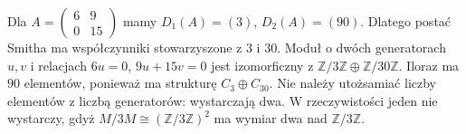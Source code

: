\begin{przyklad}
\label{aa:prz:smith-cokernel-90}
Dla $A=\begin{pmatrix}6&9\\0&15\end{pmatrix}$
mamy $D_1(A)=(3)$, $D_2(A)=(90)$. Dlatego
postać Smitha ma współczynniki stowarzyszone z $3$ i $30$.
Moduł o dwóch generatorach $u,v$ i relacjach
$6u=0$, $9u+15v=0$ jest izomorficzny z
$\mathbb Z/3\mathbb Z\oplus\mathbb Z/30\mathbb Z$.
Iloraz ma $90$ elementów, ponieważ ma strukturę
$C_3\oplus C_{30}$. Nie należy utożsamiać liczby
elementów z liczbą generatorów: wystarczają dwa.
W rzeczywistości jeden nie wystarczy, gdyż
$M/3M\cong(\mathbb Z/3\mathbb Z)^2$ ma wymiar dwa
nad $\mathbb Z/3\mathbb Z$.
\end{przyklad}


